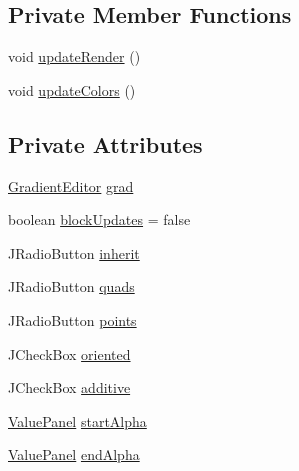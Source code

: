 \subsection*{Private Member Functions}
\begin{DoxyCompactItemize}
\item 
void \mbox{\hyperlink{classorg_1_1newdawn_1_1slick_1_1tools_1_1peditor_1_1_color_panel_a18229bf3977f7c52ea07bc593efe8d0d}{update\+Render}} ()
\item 
void \mbox{\hyperlink{classorg_1_1newdawn_1_1slick_1_1tools_1_1peditor_1_1_color_panel_a4e4c834097a549d297ed59a6d8161b77}{update\+Colors}} ()
\end{DoxyCompactItemize}
\subsection*{Private Attributes}
\begin{DoxyCompactItemize}
\item 
\mbox{\hyperlink{classorg_1_1newdawn_1_1slick_1_1tools_1_1peditor_1_1_gradient_editor}{Gradient\+Editor}} \mbox{\hyperlink{classorg_1_1newdawn_1_1slick_1_1tools_1_1peditor_1_1_color_panel_a870bf8462af2a042f865f4f11a66cf7f}{grad}}
\item 
boolean \mbox{\hyperlink{classorg_1_1newdawn_1_1slick_1_1tools_1_1peditor_1_1_color_panel_a9736800fb64f4dcd1c635469e8c5afbb}{block\+Updates}} = false
\item 
J\+Radio\+Button \mbox{\hyperlink{classorg_1_1newdawn_1_1slick_1_1tools_1_1peditor_1_1_color_panel_ae0b2c9e5d4fbdd2075719fb5157ad535}{inherit}}
\item 
J\+Radio\+Button \mbox{\hyperlink{classorg_1_1newdawn_1_1slick_1_1tools_1_1peditor_1_1_color_panel_abf4fa6b876032e7606447f1c87fdd7ca}{quads}}
\item 
J\+Radio\+Button \mbox{\hyperlink{classorg_1_1newdawn_1_1slick_1_1tools_1_1peditor_1_1_color_panel_a19fbea7cce8d6204b3f2a9f82832b51a}{points}}
\item 
J\+Check\+Box \mbox{\hyperlink{classorg_1_1newdawn_1_1slick_1_1tools_1_1peditor_1_1_color_panel_a6533414e865f5347e1ddfd2b63ed1e3c}{oriented}}
\item 
J\+Check\+Box \mbox{\hyperlink{classorg_1_1newdawn_1_1slick_1_1tools_1_1peditor_1_1_color_panel_a538f6d62e19f00dbbb4bed362005f783}{additive}}
\item 
\mbox{\hyperlink{classorg_1_1newdawn_1_1slick_1_1tools_1_1peditor_1_1_value_panel}{Value\+Panel}} \mbox{\hyperlink{classorg_1_1newdawn_1_1slick_1_1tools_1_1peditor_1_1_color_panel_afe8553cf4ac1da0b98e8d212cc5081da}{start\+Alpha}}
\item 
\mbox{\hyperlink{classorg_1_1newdawn_1_1slick_1_1tools_1_1peditor_1_1_value_panel}{Value\+Panel}} \mbox{\hyperlink{classorg_1_1newdawn_1_1slick_1_1tools_1_1peditor_1_1_color_panel_a0173ddb61e259abd353f5d8a17f75af2}{end\+Alpha}}
\end{DoxyCompactItemize}
